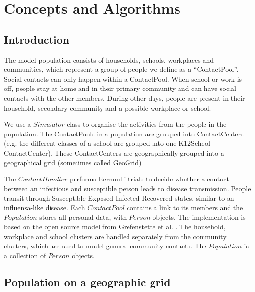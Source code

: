 \chapter{Concepts and Algorithms}
\label{chap:code}


\section{Introduction}
\label{section:ConceptsIntro}

The model population consists of households, schools, workplaces and
communities, which represent a group of people we define as a ``ContactPool''.
Social contacts can only happen within a ContactPool.
When school or work is off, people stay at home and in their primary
community and can have social contacts with the other members.
During other days, people are present in their household, secondary community
and a possible workplace or school.  



We use a $Simulator$ class to organise the activities from the people in the population.
The ContactPools in a population are grouped into ContactCenters (e.g. the different classes of a school are grouped into one K12School ContactCenter).
These ContactCenters are geographically grouped into a geographical grid (sometimes called GeoGrid)

The $Contact Handler$ performs Bernoulli trials to decide whether a contact
between an infectious and susceptible person leads to disease transmission. 
People transit through Susceptible-Exposed-Infected-Recovered states,
similar to an influenza-like disease.
Each $ContactPool$ contains a link to its members and the $Population$ stores all personal
data, with $Person$ objects.
The implementation is based on the open source model from Grefenstette et al. \cite{grefenstette2013}. 
The household, workplace and school clusters are handled separately from the
community clusters, which are used to model general community contacts. The
$Population$ is a collection of $Person$ objects.



\section{Population on a geographic grid}
\label{section:gengeopop}

